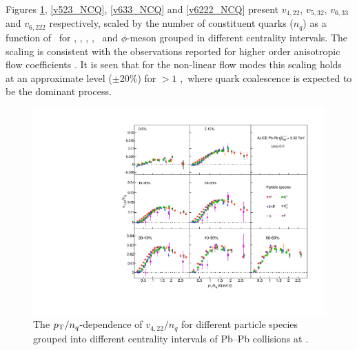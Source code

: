 
Figures \ref{v422_NCQ}, \ref{v523_NCQ}, \ref{v633_NCQ} and \ref{v6222_NCQ} present $v_{4,22}$, $v_{5,32}$, $v_{6,33}$ and $v_{6,222}$ respectively, scaled by the number of constituent quarks ($n_{q}$) as a function of \pTnq~for \pion, \kaon, \Ks, \proton, \lambdas~and $\phi$-meson grouped in different centrality intervals. The scaling is consistent with the observations reported for higher order anisotropic flow coefficients \cite{Acharya:2018zuq}. It is seen that for the non-linear flow modes this scaling holds at an approximate level ($\pm$20\%) for \pT $> 1$ \GeVc,~where quark coalescence is expected to be the dominant process.

\begin{figure}[!htb]
\begin{center}
\includegraphics[scale=0.82]{figures/scaling/All_v422_gap00_NCQ_3by3.pdf}
\end{center}
\caption{The $p_{\rm{T}}/n_{q}$-dependence of $v_{4,22}/n_{q}$ for different particle species grouped into different centrality intervals of Pb--Pb collisions at \sNN.}
\label{v422_NCQ}
\end{figure}

